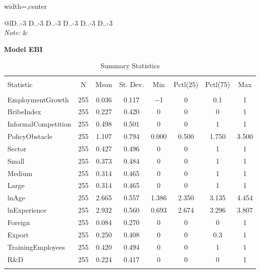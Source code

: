 \begin{landscape}
\begin{table}[!htbp]
\begin{adjustbox}{width=\columnwidth,center}
\begin{tabular}{@{\extracolsep{5pt}}lD{.}{.}{-3} D{.}{.}{-3} D{.}{.}{-3} D{.}{.}{-3} D{.}{.}{-3} D{.}{.}{-3} }
\hline 
\hline \\[-1.8ex] 
\textit{Note:}  &  \\ 
\end{tabular} 
\end{adjustbox}
\end{table}
\end{landscape}

\textbf{\Large Model EBI}

\begin{table}[H] \centering 
  \caption*{Summary Statistics} 
\begin{tabular}{@{\extracolsep{5pt}}lccccccc} 
\\[-1.8ex]\hline 
\hline \\[-1.8ex] 
Statistic & \multicolumn{1}{c}{N} & \multicolumn{1}{c}{Mean} & \multicolumn{1}{c}{St. Dev.} & \multicolumn{1}{c}{Min} & \multicolumn{1}{c}{Pctl(25)} & \multicolumn{1}{c}{Pctl(75)} & \multicolumn{1}{c}{Max} \\ 
\hline \\[-1.8ex] 
EmploymentGrowth & 255 & 0.036 & 0.117 & $-$1 & 0 & 0.1 & 1 \\ 
BribeIndex & 255 & 0.227 & 0.420 & 0 & 0 & 0 & 1 \\ 
InformalCompetition & 255 & 0.498 & 0.501 & 0 & 0 & 1 & 1 \\ 
PolicyObstacle & 255 & 1.107 & 0.794 & 0.000 & 0.500 & 1.750 & 3.500 \\ 
Sector & 255 & 0.427 & 0.496 & 0 & 0 & 1 & 1 \\ 
Small & 255 & 0.373 & 0.484 & 0 & 0 & 1 & 1 \\ 
Medium & 255 & 0.314 & 0.465 & 0 & 0 & 1 & 1 \\ 
Large & 255 & 0.314 & 0.465 & 0 & 0 & 1 & 1 \\ 
lnAge & 255 & 2.665 & 0.557 & 1.386 & 2.350 & 3.135 & 4.454 \\ 
lnExperience & 255 & 2.932 & 0.560 & 0.693 & 2.674 & 3.296 & 3.807 \\ 
Foreign & 255 & 0.084 & 0.270 & 0 & 0 & 0 & 1 \\ 
Export & 255 & 0.250 & 0.408 & 0 & 0 & 0.3 & 1 \\ 
TrainingEmployees & 255 & 0.420 & 0.494 & 0 & 0 & 1 & 1 \\ 
R\&D & 255 & 0.224 & 0.417 & 0 & 0 & 0 & 1 \\ 
\hline \\[-1.8ex] 
\end{tabular} 
\end{table} 

